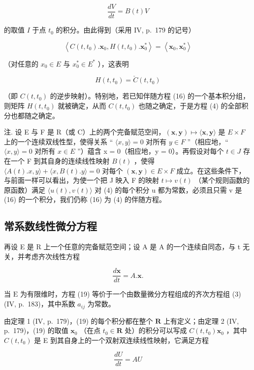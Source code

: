 \[
\frac {d V}{d t} = B (t) V\tag{17}
\]

的取值 \(I\) 于点 \(t_0\) 的积分。由此得到（采用 IV, p.~179 的记号）

\[
\left\langle C (t, t _ {0}). \mathbf {x} _ {0}, H (t, t _ {0}). \mathbf {x} _ {0} ^ {*} \right\rangle = \left\langle \mathbf {x} _ {0}, \mathbf {x} _ {0} ^ {*} \right\rangle
\]

（对任意的 \(x_{0} \in E\) 与 \(x_{0}^{*} \in E^{*}\) ），这表明

\[
H (t, t _ {0}) = \check {C} (t, t _ {0})\tag{18}
\]

（即 \(C(t, t_{0})\) 的逆步映射）。特别地，若已知伴随方程 (16) 的一个基本积分组，则矩阵 \(H(t, t_{0})\) 就被确定，从而 \(C(t, t_{0})\) 也随之确定，于是方程 (4) 的全部积分也都随之确定。

注. 设 E 与 F 是 R（或 C）上的两个完备赋范空间，\((\mathbf{x}, \mathbf{y}) \mapsto \langle \mathbf{x}, \mathbf{y} \rangle\) 是 \(E \times F\) 上的一个连续双线性型，使得关系 `` \(\langle x, y \rangle = 0\) 对所有 \(y \in F\) ''（相应地，`` \(\langle x, y \rangle = 0\) 对所有 \(x \in E\) ''）蕴含 x = 0（相应地，y = 0）。再假设对每个 \(t \in J\) 存在一个 F 到其自身的连续线性映射 \(B(t)\) ，使得 \(\langle A(t).x, y \rangle + \langle x, B(t).y \rangle = 0\) 对每个 \((\mathbf{x}, \mathbf{y}) \in E \times F\) 成立。在这些条件下，与前面一样可以看出，为使一个把 J 映入 F 的映射 \(t \mapsto v(t)\) （某个规则函数的原函数）满足 \(\langle u(t), v(t) \rangle\) 对 (4) 的每个积分 u 都为常数，必须且只需 v 是 (16) 的一个积分，我们仍称 (16) 为 (4) 的伴随方程。

\subsection{常系数线性微分方程}

再设 E 是 R 上一个任意的完备赋范空间；设 A 是 A 的一个连续自同态，与 t 无关，并考虑齐次线性方程

\[
{\frac {d \mathbf {x}}{d t}} = A. \mathbf {x}.\tag{19}
\]

当 \(\mathrm{E}\) 为有限维时，方程 (19) 等价于一个由数量微分方程组成的齐次方程组 (3) (IV, p.~183)，其中系数 \(a_{ij}\) 为常数。

由定理 1 (IV, p.~179)，(19) 的每个积分都在整个 \(\mathbf{R}\) 上有定义；由定理 2 (IV, p.~179)，(19) 的取值 \(\mathbf{x}_0\) （在点 \(t_0 \in \mathbf{R}\) 处）的积分可以写成 \(C(t, t_0)\mathbf{x}_0\) ，其中 \(C(t, t_0)\) 是 E 到其自身上的一个双射双连续线性映射，它满足方程

\[
\frac {d U}{d t} = A U\tag{20}
\]

